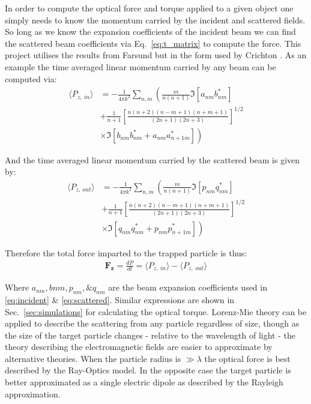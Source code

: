 In order to compute the optical force and torque applied to a 
given object one simply needs to know the momentum carried by 
the incident and scattered fields. So long as we know the 
expansion coefficients of the incident beam we can find the 
scattered beam coefficients via Eq.~\eqref{eq:t_matrix} to 
compute the force. This project utilises the results from 
Farsund \cite{Farsund1996} but in the form used by Crichton 
\cite{Crichton2000THEMD}. As an example the time averaged linear 
momentum carried by any beam can be computed via:
\begin{equation}
	\label{eq:linear_momentum_in}
	\begin{split}
		\langle P_{z,\ in} \rangle
		&=
		-\frac{1}{4\pi k^2}\sum_{n,m} \left(\frac{m}{n(n+1)}\Im[a_{nm}b^*_{nm}] \right.
		\\ 
		&+\frac{1}{n+1}\left[\frac{n(n+2)(n-m+1)(n+m+1)}{(2n+1)(2n+3)} \right]^{1/2}
		\\
		& \left.\times\Im[b_{nm}b^*_{nm}+a_{nm}a^*_{n+1m}] \right)
	\end{split}
\end{equation}

And the time averaged linear momentum carried by the scattered 
beam is given by:
\begin{equation}
	\label{eq:linear_momentum_out}
	\begin{split}
		\langle P_{z,\ out} \rangle
		&=
		-\frac{1}{4\pi k^2}\sum_{n,m} \left(\frac{m}{n(n+1)}\Im[p_{nm}q^*_{nm}] \right.
		\\ 
		&+\frac{1}{n+1}\left[\frac{n(n+2)(n-m+1)(n+m+1)}{(2n+1)(2n+3)} \right]^{1/2}
		\\
		& \left.\times\Im[q_{nm}q^*_{nm}+p_{nm}p^*_{n+1m}] \right)
	\end{split}
\end{equation}

Therefore the total force imparted to the trapped particle is thus:
\begin{align}
	\boldsymbol{F_z} =\frac{dP}{dt} = \langle P_{z,\ in}\rangle 
	-\langle P_{z,\ out}\rangle
	\label{eq:Fz}
\end{align}

\noindent
Where $a_{nm}, b{nm}, p_{nm}, \& q_{nm}$ are the beam expansion 
coefficients used in \eqref{eq:incident} \& \eqref{eq:scattered}.
Similar expressions are shown in Sec.~\ref{sec:simulations} for 
calculating the optical torque. Lorenz-Mie theory can be applied 
to describe the scattering from any particle regardless of size, 
though as the size of the target particle changes - relative to 
the wavelength of light - the theory describing the electromagnetic 
fields are easier to approximate by alternative theories. When the 
particle radius is $\gg \lambda$ the optical force is best described 
by the Ray-Optics model. In the opposite case the target particle is 
better approximated as a single electric dipole as described by 
the Rayleigh approximation.  

